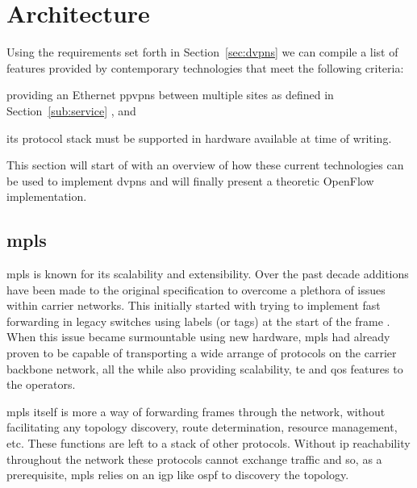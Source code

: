 \section{Architecture} %
\label{sec:implementation}

% 
% 
% 

Using the requirements set forth in Section~\ref{sec:dvpns} we can compile a list of features provided by contemporary technologies that meet the following criteria:
\begin{inparaenum}[\itshape 1\upshape)]
	\item providing an Ethernet \acp{ppvpn} between multiple sites as defined in Section~\ref{sub:service} , and
	\item its protocol stack must be supported in hardware available at time of writing.
	\label{lst:num}
\end{inparaenum}
This section will start of with an overview of how these current technologies can be used to implement \acp{dvpn} and will finally present a theoretic OpenFlow implementation.


\subsection{\acs{mpls}} %
\label{sub:mpls}

\ac{mpls} is known for its scalability and extensibility. Over the past decade additions have been made to the original specification to overcome a plethora of issues within carrier networks. This initially started with trying to implement fast forwarding in legacy switches using labels (or tags) at the start of the frame \cite{tag-switching}. When this issue became surmountable using new hardware, \ac{mpls} had already proven to be capable of transporting a wide arrange of protocols on the carrier backbone network, all the while also providing scalability, \ac{te} and \ac{qos} features to the operators.

\ac{mpls} itself is more a way of forwarding frames through the network, without facilitating any topology discovery, route determination, resource management, etc. These functions are left to a stack of other protocols. Without \ac{ip} reachability throughout the network these protocols cannot exchange traffic and so, as a prerequisite, \ac{mpls} relies on an \ac{igp} like \ac{ospf} to discovery the topology.

